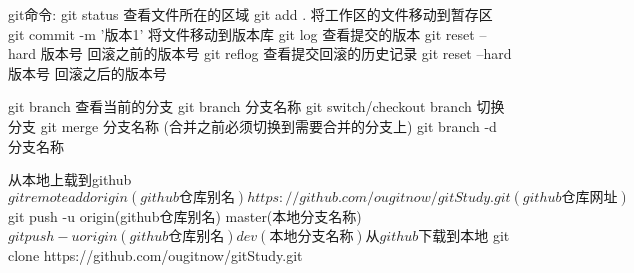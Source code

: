 git命令:
git status 查看文件所在的区域
git add .   将工作区的文件移动到暂存区
git commit -m '版本1' 将文件移动到版本库
git log 查看提交的版本
git reset --hard 版本号 回滚之前的版本号
git reflog 查看提交回滚的历史记录
git reset --hard 版本号 回滚之后的版本号

git branch 查看当前的分支
git branch 分支名称
git switch/checkout branch 切换分支
git merge 分支名称 (合并之前必须切换到需要合并的分支上)
git branch -d 分支名称

从本地上载到github
$ git remote add origin(github仓库别名) https://github.com/ougitnow/gitStudy.git(github仓库网址)
$ git push -u origin(github仓库别名)  master(本地分支名称)
$ git push -u origin(github仓库别名)  dev(本地分支名称)

从github下载到本地
$ git clone https://github.com/ougitnow/gitStudy.git
